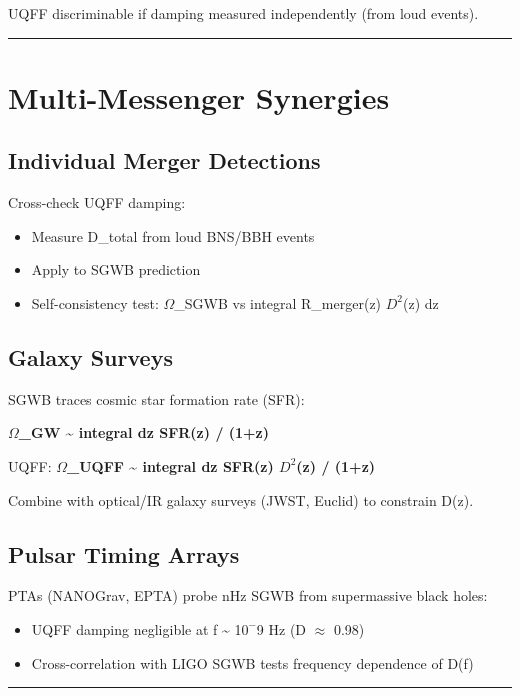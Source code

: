 \documentclass[12pt,a4paper]{article}
\begin{document}
UQFF discriminable if damping measured independently (from loud events).

\medskip\hrule\medskip

\section{Multi-Messenger Synergies}

\subsection{Individual Merger Detections}

Cross-check UQFF damping:

\begin{itemize}
  \item Measure D\_total from loud BNS/BBH events
  \item Apply to SGWB prediction
  \item Self-consistency test: $\Omega$\_SGWB vs integral  R\_merger(z) $D^{2}$(z) dz
\end{itemize}

\subsection{Galaxy Surveys}

SGWB traces cosmic star formation rate (SFR):

\textbf{$\Omega$\_GW \textasciitilde{}  integral  dz SFR(z) / (1+z)}

UQFF: \textbf{$\Omega$\_UQFF \textasciitilde{}  integral  dz SFR(z) $D^{2}$(z) / (1+z)}

Combine with optical/IR galaxy surveys (JWST, Euclid) to constrain D(z).

\subsection{Pulsar Timing Arrays}

PTAs (NANOGrav, EPTA) probe nHz SGWB from supermassive black holes:

\begin{itemize}
  \item UQFF damping negligible at f \textasciitilde{} 1$0^{-}$9 Hz (D $\approx$ 0.98)
  \item Cross-correlation with LIGO SGWB tests frequency dependence of D(f)
\end{itemize}

\medskip\hrule\medskip
\end{document}
